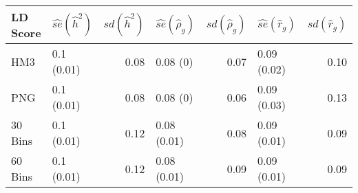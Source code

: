 \begin{table}[ht]
\centering
\begin{tabular}{llrlrlr}
  \hline
LD Score & $\widehat{se}(\hat{h}^2)$ & $sd(\hat{h}^2)$ & $\widehat{se}(\hat{\rho}_g)$ & $sd(\hat{\rho}_g)$ & $\widehat{se}(\hat{r}_g)$ & $sd(\hat{r}_g)$ \\ 
  \hline
HM3 & 0.1 (0.01) & 0.08 & 0.08 (0) & 0.07 & 0.09 (0.02) & 0.10 \\ 
  PNG & 0.1 (0.01) & 0.08 & 0.08 (0) & 0.06 & 0.09 (0.03) & 0.13 \\ 
  30 Bins & 0.1 (0.01) & 0.12 & 0.08 (0.01) & 0.08 & 0.09 (0.01) & 0.09 \\ 
  60 Bins & 0.1 (0.01) & 0.12 & 0.08 (0.01) & 0.09 & 0.09 (0.01) & 0.09 \\ 
   \hline
\end{tabular}
\end{table}
